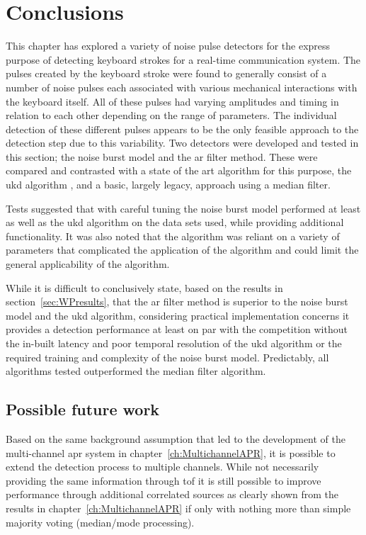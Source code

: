 \section{Conclusions}\label{sec:WPconclusions}

This chapter has explored a variety of noise pulse detectors for the express purpose of detecting keyboard strokes for a real-time communication system. The pulses created by the keyboard stroke were found to generally consist of a number of noise pulses each associated with various mechanical interactions with the keyboard itself. All of these pulses had varying amplitudes and timing in relation to each other depending on the range of parameters. The individual detection of these different pulses appears to be the only feasible approach to the detection step due to this variability. Two detectors were developed and tested in this section; the noise burst model and the \gls{ar} filter method. These were compared and contrasted with a state of the art algorithm for this purpose, the \gls{ukd} algorithm \cite{Subramanya2007}, and a basic, largely legacy, approach using a median filter.

Tests suggested that with careful tuning the noise burst model performed at least as well as the \gls{ukd} algorithm on the data sets used, while providing additional functionality. It was also noted that the algorithm was reliant on a variety of parameters that complicated the application of the algorithm and could limit the general applicability of the algorithm.

While it is difficult to conclusively state, based on the results in section~\ref{sec:WPresults}, that the \gls{ar} filter method is superior to the noise burst model and the \gls{ukd} algorithm, considering practical implementation concerns it provides a detection performance at least on par with the competition without the in-built latency and poor temporal resolution of the \gls{ukd} algorithm or the required training and complexity of the noise burst model. Predictably, all algorithms tested outperformed the median filter algorithm.

\subsection{Possible future work}
Based on the same background assumption that led to the development of the multi-channel \gls{apr} system in chapter~\ref{ch:MultichannelAPR}, it is possible to extend the detection process to multiple channels. While not necessarily providing the same information through \gls{tof} it is still possible to improve performance through additional correlated sources as clearly shown from the results in chapter~\ref{ch:MultichannelAPR} if only with nothing more than simple majority voting (median/mode processing).

